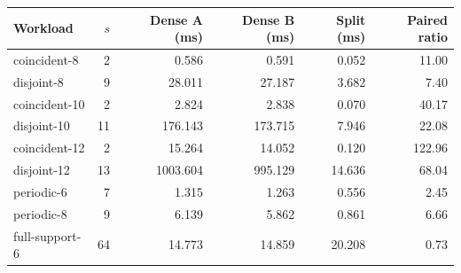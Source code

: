 \begin{tabular}{lrrrrr}
\toprule
Workload & $s$ & Dense A (ms) & Dense B (ms) & Split (ms) & Paired ratio\\
\midrule
coincident-8 & 2 & 0.586 & 0.591 & 0.052 & 11.00\\
disjoint-8 & 9 & 28.011 & 27.187 & 3.682 & 7.40\\
coincident-10 & 2 & 2.824 & 2.838 & 0.070 & 40.17\\
disjoint-10 & 11 & 176.143 & 173.715 & 7.946 & 22.08\\
coincident-12 & 2 & 15.264 & 14.052 & 0.120 & 122.96\\
disjoint-12 & 13 & 1003.604 & 995.129 & 14.636 & 68.04\\
periodic-6 & 7 & 1.315 & 1.263 & 0.556 & 2.45\\
periodic-8 & 9 & 6.139 & 5.862 & 0.861 & 6.66\\
full-support-6 & 64 & 14.773 & 14.859 & 20.208 & 0.73\\
\bottomrule
\end{tabular}
